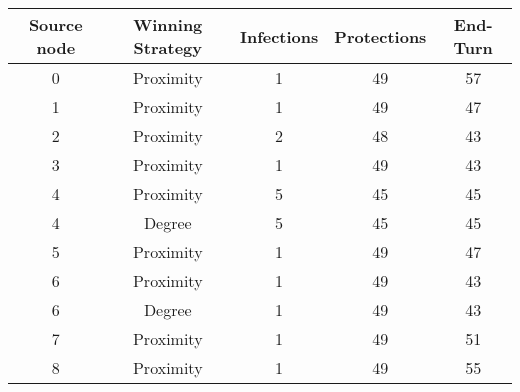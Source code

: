 \documentclass[results.tex]{subfiles}
\begin{document}
    \begin{center}
        \begin{tabular}{| c || c | c | c | c |}
            \hline
            {\bfseries Source node} & {\bfseries Winning Strategy} & {\bfseries Infections} & {\bfseries Protections}
            & {\bfseries End-Turn}
            \\  %
            \hline\hline
            0                       & Proximity                    & 1                      & 49                      & 57                   \\
            \hline
            1                       & Proximity                    & 1                      & 49                      & 47                   \\
            \hline
            2                       & Proximity                    & 2                      & 48                      & 43                   \\
            \hline
            3                       & Proximity                    & 1                      & 49                      & 43                   \\
            \hline
            4                       & Proximity                    & 5                      & 45                      & 45                   \\
            \hline
            4                       & Degree                       & 5                      & 45                      & 45                   \\
            \hline
            5                       & Proximity                    & 1                      & 49                      & 47                   \\
            \hline
            6                       & Proximity                    & 1                      & 49                      & 43                   \\
            \hline
            6                       & Degree                       & 1                      & 49                      & 43                   \\
            \hline
            7                       & Proximity                    & 1                      & 49                      & 51                   \\
            \hline
            8                       & Proximity                    & 1                      & 49                      & 55                   \\

\end{tabular}
\end{center}
\end{document}
